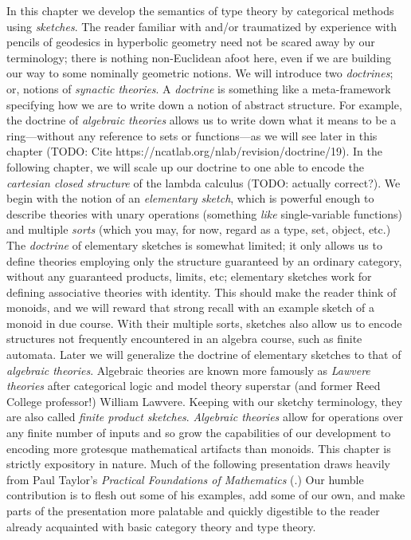 \documentclass[12pt,twoside]{reedthesis}
\theoremstyle{definition}
\theoremstyle{remark}
\theoremstyle{theorem}
\begin{document}
In this chapter we develop the semantics of type theory by categorical methods
using \emph{sketches}. The reader familiar with and/or traumatized by experience
with pencils of geodesics in hyperbolic geometry need not be scared away by our
terminology; there is nothing non-Euclidean afoot here, even if we are building
our way to some nominally geometric notions. We will introduce two
\emph{doctrines}; or, notions of \emph{synactic theories}. A \emph{doctrine} is
something like a meta-framework specifying how we are to write down a notion of
abstract structure. For example, the doctrine of \emph{algebraic theories}
allows us to write down what it means to be a ring---without any reference to sets
or functions---as we will see later in this chapter (TODO: Cite
https://ncatlab.org/nlab/revision/doctrine/19). In the following chapter, we
will scale up our doctrine to one able to encode the \emph{cartesian closed
  structure} of the lambda calculus (TODO: actually correct?). We begin with the
notion of an \emph{elementary sketch}, which is powerful enough to describe
theories with unary operations (something \emph{like} single-variable functions)
and multiple \emph{sorts} (which you may, for now, regard as a type, set,
object, etc.) The \emph{doctrine} of elementary sketches is somewhat limited; it
only allows us to define theories employing only the structure guaranteed by an
ordinary category, without any guaranteed products, limits, etc; elementary
sketches work for defining associative theories with identity. This should make
the reader think of monoids, and we will reward that strong recall with an
example sketch of a monoid in due course. With their multiple sorts, sketches
also allow us to encode structures not frequently encountered in an algebra
course, such as finite automata. Later we will generalize the doctrine of
elementary sketches to that of \emph{algebraic theories}. Algebraic theories are
known more famously as \emph{Lawvere theories} after categorical logic and model
theory superstar (and former Reed College professor!) William Lawvere. Keeping
with our sketchy terminology, they are also called \emph{finite product
  sketches}. \emph{Algebraic theories} allow for operations over any finite
number of inputs and so grow the capabilities of our development to encoding
more grotesque mathematical artifacts than monoids. This chapter is strictly
expository in nature. Much of the following presentation draws heavily from Paul
Taylor's \emph{Practical Foundations of Mathematics}
(\cite{taylor_practical_1999}.) Our humble contribution is to flesh out some of
his examples, add some of our own, and make parts of the presentation more
palatable and quickly digestible to the reader already acquainted with basic
category theory and type theory.
\end{document}
